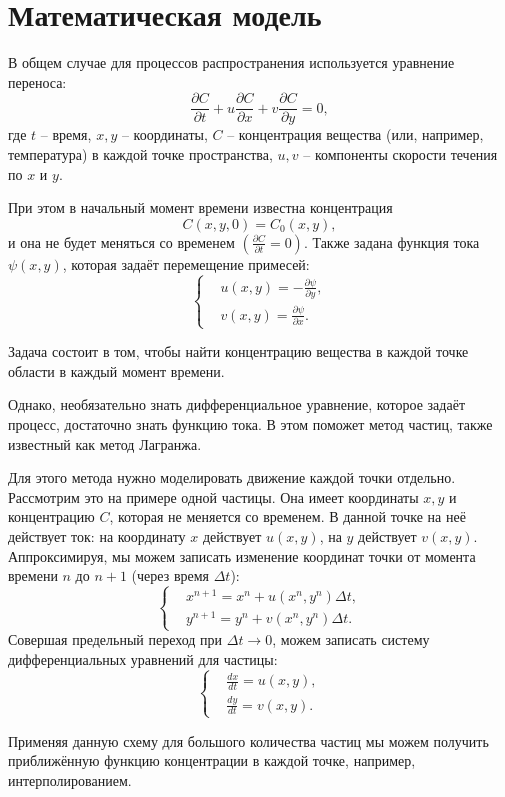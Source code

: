 \section{Математическая модель}
    В общем случае для процессов распространения используется уравнение переноса:
    \[
        \frac{\partial C}{\partial t} + u \frac{\partial C}{\partial x} + v \frac{\partial C}{\partial y} = 0,
    \]
    где \( t \) -- время, \( x, y \) -- координаты, \( C \) -- концентрация вещества (или, например, температура) в каждой точке пространства, \( u, v \) -- компоненты скорости течения по \( x \) и \( y \). 
    
    При этом в начальный момент времени известна концентрация
    \[
        C(x, y, 0) = C_0 (x, y),
    \]
    и она не будет меняться со временем \( \left( \frac{\partial C}{\partial t} = 0 \right) \). Также задана функция тока \( \psi(x, y) \), которая задаёт перемещение примесей: 
    \[
        \left\{
            \begin{split}
                & u(x, y) = -\frac{\partial \psi}{\partial y}, \\
                & v(x, y) = \frac{\partial \psi}{\partial x}.
            \end{split}
        \right.
    \]

    Задача состоит в том, чтобы найти концентрацию вещества в каждой точке области в каждый момент времени.

    Однако, необязательно знать дифференциальное уравнение, которое задаёт процесс, достаточно знать функцию тока. В этом поможет метод частиц, также известный как метод Лагранжа.

    Для этого метода нужно моделировать движение каждой точки отдельно. Рассмотрим это на примере одной частицы. Она имеет координаты \( x, y \) и концентрацию \( C \), которая не меняется со временем. В данной точке на неё действует ток: на координату \( x \) действует \( u(x, y) \), на \( y \) действует \( v(x, y) \). Аппроксимируя, мы можем записать изменение координат точки от момента времени \( n \) до \( n+1 \) (через время \( \Delta t \)):
    \[
        \left\{
            \begin{split}
                & x^{n+1} = x^n + u(x^n, y^n) \Delta t, \\
                & y^{n+1} = y^n + v(x^n, y^n) \Delta t.
            \end{split}
        \right.
    \]
    Совершая предельный переход при \( \Delta t \to 0 \), можем записать систему дифференциальных уравнений для частицы:
    \[
        \left\{
            \begin{split}
                & \frac{dx}{dt} = u(x, y), \\
                & \frac{dy}{dt} = v(x, y).
            \end{split}
        \right.
    \]

    Применяя данную схему для большого количества частиц мы можем получить приближённую функцию концентрации в каждой точке, например, интерполированием.